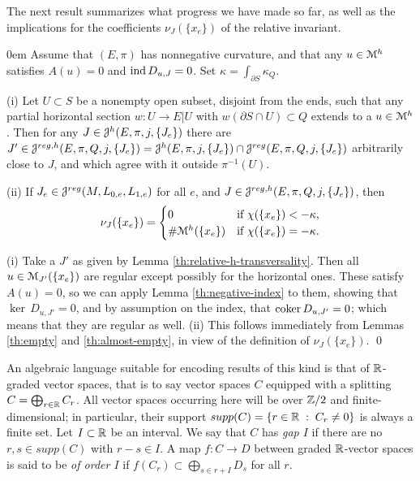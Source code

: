 \documentclass[10pt,letterpaper]{article}
\begin{document}
The next result summarizes what progress we have made so far, as well as the
implications for the coefficients $\nu_J(\{x_e\})$ of the relative invariant.

\begin{prop} \parindent0em \label{th:nonnegative-one}
Assume that $(E,\pi)$ has nonnegative curvature, and that any $u \in \mathcal{M}^h$
satisfies $A(u) = 0$ and $\mathrm{ind}\,D_{u,J} = 0$. Set $\kappa = \int_{\partial S}
\kappa_Q$.

(i) Let $U \subset S$ be a nonempty open subset, disjoint from the ends, such
that any partial horizontal section $w: U \rightarrow E|U$ with $w(\partial S
\cap U) \subset Q$ extends to a $u \in \mathcal{M}^h$. Then for any $J \in
\mathcal{J}^h(E,\pi,j,\{J_e\})$ there are $J' \in \mathcal{J}^{reg,h}(E,\pi,Q,j,\{J_e\}) =
\mathcal{J}^h(E,\pi,j,\{J_e\}) \cap \mathcal{J}^{reg}(E,\pi,Q,j,\{J_e\})$ arbitrarily close to
$J$, and which agree with it outside $\pi^{-1}(U)$.

(ii) If $J_e \in \mathcal{J}^{reg}(M,L_{0,e},L_{1,e})$ for all $e$, and $J \in
\mathcal{J}^{reg,h}(E,\pi,Q,j,\{J_e\})$, then
\[
 \nu_J(\{x_e\}) =
 \begin{cases}
 0 & \text{if $\chi(\{x_e\}) < -\kappa$,} \\
 \#\mathcal{M}^h(\{x_e\}) & \text{if $\chi(\{x_e\}) = -\kappa$.}
 \end{cases}
\]
\end{prop}

\proof (i) Take a $J'$ as given by Lemma \ref{th:relative-h-transversality}.
Then all $u \in \mathcal{M}_{J'}(\{x_e\})$ are regular except possibly for the
horizontal ones. These satisfy $A(u) = 0$, so we can apply Lemma
\ref{th:negative-index} to them, showing that $\ker\,D_{u,J'} = 0$, and by
assumption on the index, that $\mathrm{coker}\,D_{u,J'} = 0$; which means that they are
regular as well. (ii) This follows immediately from Lemmas \ref{th:empty} and
\ref{th:almost-empty}, in view of the definition of $\nu_J(\{x_e\})$. \qed

An algebraic language suitable for encoding results of this kind is that of
$\mathbb{R}$-graded vector spaces, that is to say vector spaces $C$ equipped with a
splitting $C = \bigoplus_{r \in \mathbb{R}} C_r$. All vector spaces occurring here will
be over $\mathbb{Z}/2$ and finite-dimensional; in particular, their support $supp(C) =
\{r \in \mathbb{R} \; : \; C_r \neq 0\}$ is always a finite set. Let $I \subset \mathbb{R}$
be an interval. We say that $C$ has {\em gap $I$} if there are no $r,s \in
supp(C)$ with $r-s \in I$. A map $f: C \rightarrow D$ between graded
$\mathbb{R}$-vector spaces is said to be {\em of order $I$} if $f(C_r) \subset
\bigoplus_{s \in r + I} D_s$ for all $r$.
\end{document}
